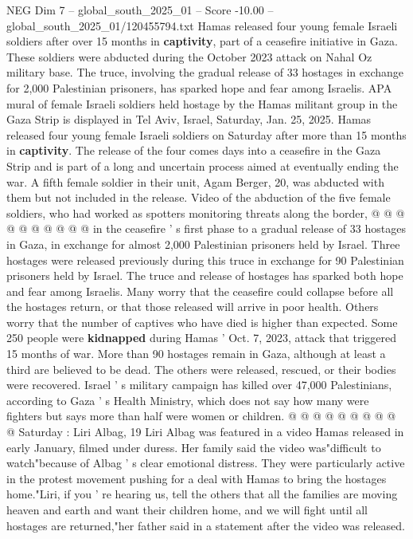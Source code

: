 \begin{textsample}{NEG Dim 7 – global\_south\_2025\_01 – Score -10.00 – global\_south\_2025\_01/120455794.txt}  \label{ex:f7_neg_191}
Hamas released four young female Israeli soldiers after over 15 months in \textbf{captivity}, part of a ceasefire initiative in Gaza.
These soldiers were abducted during the October 2023 attack on Nahal Oz military base.
The truce, involving the gradual release of 33 hostages in exchange for 2,000 Palestinian prisoners, has sparked hope and fear among Israelis.
APA mural of female Israeli soldiers held hostage by the Hamas militant group in the Gaza Strip is displayed in Tel Aviv, Israel, Saturday, Jan. 25, 2025.
Hamas released four young female Israeli soldiers on Saturday after more than 15 months in \textbf{captivity}.
The release of the four comes days into a ceasefire in the Gaza Strip and is part of a long and uncertain process aimed at eventually ending the war.
A fifth female soldier in their unit, Agam Berger, 20, was abducted with them but not included in the release.
Video of the abduction of the five female soldiers, who had worked as spotters monitoring threats along the border, @ @ @ @ @ @ @ @ @ @ in the ceasefire ' s first phase to a gradual release of 33 hostages in Gaza, in exchange for almost 2,000 Palestinian prisoners held by Israel.
Three hostages were released previously during this truce in exchange for 90 Palestinian prisoners held by Israel.
The truce and release of hostages has sparked both hope and fear among Israelis.
Many worry that the ceasefire could collapse before all the hostages return, or that those released will arrive in poor health.
Others worry that the number of captives who have died is higher than expected.
Some 250 people were \textbf{kidnapped} during Hamas ' Oct. 7, 2023, attack that triggered 15 months of war.
More than 90 hostages remain in Gaza, although at least a third are believed to be dead.
The others were released, rescued, or their bodies were recovered.
Israel ' s military campaign has killed over 47,000 Palestinians, according to Gaza ' s Health Ministry, which does not say how many were fighters but says more than half were women or children. @ @ @ @ @ @ @ @ @ @ Saturday : Liri Albag, 19 Liri Albag was featured in a video Hamas released in early January, filmed under duress.
Her family said the video was"difficult to watch"because of Albag ' s clear emotional distress.
They were particularly active in the protest movement pushing for a deal with Hamas to bring the hostages home."Liri, if you ' re hearing us, tell the others that all the families are moving heaven and earth and want their children home, and we will fight until all hostages are returned,"her father said in a statement after the video was released.

\end{textsample}
